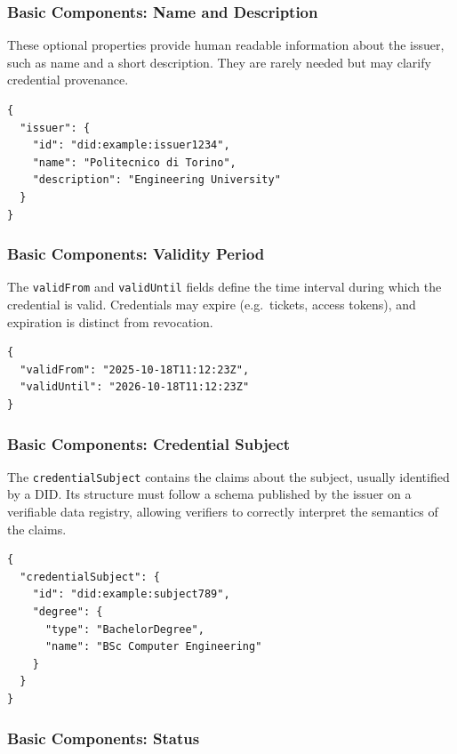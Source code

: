 \medskip

\subsubsection*{Basic Components: Name and Description}

These optional properties provide human readable information about the issuer,
such as name and a short description.  
They are rarely needed but may clarify credential provenance.

\begin{verbatim}
{
  "issuer": {
    "id": "did:example:issuer1234",
    "name": "Politecnico di Torino",
    "description": "Engineering University"
  }
}
\end{verbatim}

\medskip

\subsubsection*{Basic Components: Validity Period}

The \texttt{validFrom} and \texttt{validUntil} fields define the time interval
during which the credential is valid.  
Credentials may expire (e.g.\ tickets, access tokens), and expiration is distinct
from revocation.

\begin{verbatim}
{
  "validFrom": "2025-10-18T11:12:23Z",
  "validUntil": "2026-10-18T11:12:23Z"
}
\end{verbatim}

\medskip

\subsubsection*{Basic Components: Credential Subject}

The \texttt{credentialSubject} contains the claims about the subject, usually 
identified by a DID.  
Its structure must follow a schema published by the issuer on a verifiable data
registry, allowing verifiers to correctly interpret the semantics of the claims.

\begin{verbatim}
{
  "credentialSubject": {
    "id": "did:example:subject789",
    "degree": {
      "type": "BachelorDegree",
      "name": "BSc Computer Engineering"
    }
  }
}
\end{verbatim}

\medskip

\subsubsection*{Basic Components: Status}

